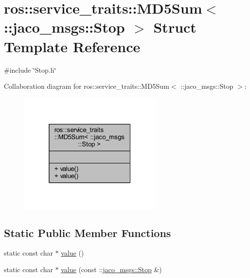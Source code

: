 \hypertarget{structros_1_1service__traits_1_1MD5Sum_3_01_1_1jaco__msgs_1_1Stop_01_4}{}\section{ros\+:\+:service\+\_\+traits\+:\+:M\+D5\+Sum$<$ \+:\+:jaco\+\_\+msgs\+:\+:Stop $>$ Struct Template Reference}
\label{structros_1_1service__traits_1_1MD5Sum_3_01_1_1jaco__msgs_1_1Stop_01_4}


{\ttfamily \#include \char`\"{}Stop.\+h\char`\"{}}



Collaboration diagram for ros\+:\+:service\+\_\+traits\+:\+:M\+D5\+Sum$<$ \+:\+:jaco\+\_\+msgs\+:\+:Stop $>$\+:
\nopagebreak
\begin{figure}[H]
\begin{center}
\leavevmode
\includegraphics[width=205pt]{d0/deb/structros_1_1service__traits_1_1MD5Sum_3_01_1_1jaco__msgs_1_1Stop_01_4__coll__graph}
\end{center}
\end{figure}
\subsection*{Static Public Member Functions}
\begin{DoxyCompactItemize}
\item 
static const char $\ast$ \hyperlink{structros_1_1service__traits_1_1MD5Sum_3_01_1_1jaco__msgs_1_1Stop_01_4_a9ec34e3a862cd1392283cf9baa87b247}{value} ()
\item 
static const char $\ast$ \hyperlink{structros_1_1service__traits_1_1MD5Sum_3_01_1_1jaco__msgs_1_1Stop_01_4_ab02827c71ebd523fc3ba33233612962b}{value} (const \+::\hyperlink{namespacejaco__msgs_df/d54/structjaco__msgs_1_1Stop}{jaco\+\_\+msgs\+::\+Stop} \&)
\end{DoxyCompactItemize}


